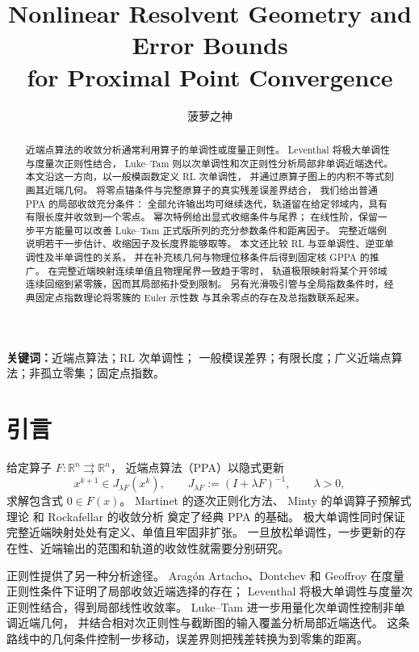 \title{Nonlinear Resolvent Geometry and Error Bounds\\
for Proximal Point Convergence}
\author{菠萝之神}
\date{}
\maketitle

\begin{abstract}
近端点算法的收敛分析通常利用算子的单调性或度量正则性。
Leventhal 将极大单调性与度量次正则性结合，
Luke--Tam 则以次单调性和次正则性分析局部非单调近端迭代。
本文沿这一方向，以一般模函数定义 RL 次单调性，
并通过原算子图上的内积不等式刻画其近端几何。
将零点锚条件与完整原算子的真实残差误差界结合，
我们给出普通 PPA 的局部收敛充分条件：
全部允许输出均可继续迭代，轨道留在给定邻域内，具有有限长度并收敛到一个零点。
幂次特例给出显式收缩条件与尾界；
在线性阶，保留一步平方能量可以改善 Luke--Tam 正式版所列的充分参数条件和距离因子。
完整近端例说明若干一步估计、收缩因子及长度界能够取等。
本文还比较 RL 与亚单调性、逆亚单调性及半单调性的关系，
并在补充核几何与物理位移条件后得到固定核 GPPA 的推广。
在完整近端映射连续单值且物理尾界一致趋于零时，
轨道极限映射将某个开邻域连续回缩到紧零簇，因而其局部拓扑受到限制。
另有光滑吸引管与全局指数条件时，经典固定点指数理论将零簇的 Euler 示性数
与其余零点的存在及总指数联系起来。
\end{abstract}

\medskip
\noindent\textbf{关键词：}近端点算法；RL 次单调性；
一般模误差界；有限长度；广义近端点算法；非孤立零集；固定点指数。

\section*{引言}
\label{sec:introduction}

给定算子 $F:\mathbb R^n\rightrightarrows\mathbb R^n$，
近端点算法（PPA）以隐式更新
\[
 x^{k+1}\in J_{\lambda F}(x^k),\qquad
 J_{\lambda F}:=(I+\lambda F)^{-1},\qquad\lambda>0,
\]
求解包含式 $0\in F(x)$。
Martinet 的逐次正则化方法\cite{Martinet1970}、
Minty 的单调算子预解式理论\cite{Minty1962}
和 Rockafellar 的收敛分析\cite{Rockafellar1976PPA}
奠定了经典 PPA 的基础。
极大单调性同时保证完整近端映射处处有定义、单值且牢固非扩张。
一旦放松单调性，一步更新的存在性、近端输出的范围和轨道的收敛性就需要分别研究。

正则性提供了另一种分析途径。
Arag\'on Artacho、Dontchev 和 Geoffroy
\cite{AragonDontchevGeoffroy2007}
在度量正则性条件下证明了局部收敛近端选择的存在；
Leventhal\cite[Theorem~3.1]{Leventhal2009MetricSubregularityPPA}
将极大单调性与度量次正则性结合，得到局部线性收敛率。
Luke--Tam\cite[Assumption~2, Theorem~2]{LukeTam2025GeneralizedMonotonicity}
进一步用量化次单调性控制非单调近端几何，
并结合相对次正则性与截断图的输入覆盖分析局部近端迭代。
这条路线中的几何条件控制一步移动，误差界则把残差转换为到零集的距离。

